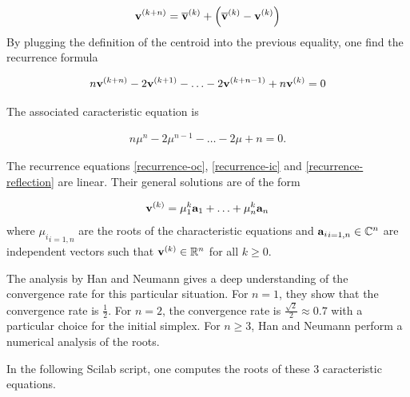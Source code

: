 \begin{eqnarray}
\mathbf{v}^{(k+n)} = \overline{\bold{v}}^{(k)} 
+ \left( \overline{\bold{v}}^{(k)} - \mathbf{v}^{(k)}\right) 
\end{eqnarray}
By plugging the definition of the centroid into the previous equality, one 
find the recurrence formula

\begin{eqnarray}
n \mathbf{v}^{(k+n)} - 2 \mathbf{v}^{(k+1)} - \ldots - 2 \mathbf{v}^{(k+n-1)} + n\mathbf{v}^{(k)} = 0
\end{eqnarray}

The associated caracteristic equation is 

\begin{eqnarray}
\label{recurrence-reflection}
n \mu^n - 2 \mu^{n-1} - \ldots - 2 \mu + n = 0.
\end{eqnarray}

The recurrence equations \ref{recurrence-oc}, \ref{recurrence-ic} and \ref{recurrence-reflection}
are linear. Their general solutions are of the form 

\begin{eqnarray}
\mathbf{v}^{(k)} = \mu_1^k \bold{a}_1 + \ldots + \mu_n^k \bold{a}_n
\end{eqnarray}
where ${\mu_i}_{i=1,n}$ are the roots of the characteristic equations and 
${\bold{a}_i}_{i=1,n} \in \mathbb{C}^n$ are independent vectors such that $\mathbf{v}^{(k)} \in \mathbb{R}^n$
for all $k\geq 0$.

The analysis by Han and Neumann \cite{HanNeumann2006} gives a 
deep understanding of the convergence rate for this particular 
situation. For $n=1$, they show that the convergence rate is $\frac{1}{2}$.
For $n=2$, the convergence rate is $\frac{\sqrt{2}}{2}\approx 0.7$ with
a particular choice for the initial simplex. For $n\geq 3$, Han and Neumann \cite{HanNeumann2006}
perform a numerical analysis of the roots.

In the following Scilab script, one computes the roots of these 3 caracteristic 
equations. 

